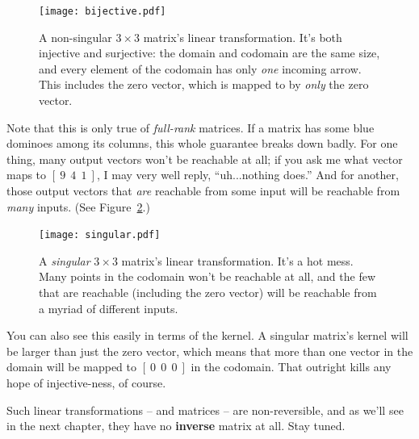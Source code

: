 \begin{figure}[hb]
\centering
\texttt{[image: bijective.pdf]}
\caption{A non-singular $3\times 3$ matrix's linear transformation. It's both
injective and surjective: the domain and codomain are the same size, and every
element of the codomain has only \textit{one} incoming arrow. This includes the
zero vector, which is mapped to by \textit{only} the zero vector.}
\label{fig:bijective}
\end{figure}

Note that this is only true of \textit{full-rank} matrices. If a matrix has
some blue dominoes among its columns, this whole guarantee breaks down badly.
For one thing, many output vectors won't be reachable at all; if you ask me
what vector maps to $[\ 9\ \ 4\ \ 1\ ]$, I may very well reply,
``uh...nothing does.'' And for another, those output vectors that \textit{are}
reachable from some input will be reachable from \textit{many} inputs. (See
Figure~\ref{fig:singular}.)

\begin{figure}[ht]
\centering
\texttt{[image: singular.pdf]}
\caption{A \textit{singular} $3\times 3$ matrix's linear transformation. It's a
hot mess. Many points in the codomain won't be reachable at all, and the few
that are reachable (including the zero vector) will be reachable from a myriad
of different inputs.}
\label{fig:singular}
\end{figure}


You can also see this easily in terms of the kernel. A singular matrix's kernel
will be larger than just the zero vector, which means that more than one vector
in the domain will be mapped to $[\ 0\ \ 0\ \ 0\ ]$ in the codomain. That
outright kills any hope of injective-ness, of course.


Such linear transformations -- and matrices -- are non-reversible, and as we'll
see in the next chapter, they have no \textbf{inverse} matrix at all. Stay
tuned.
